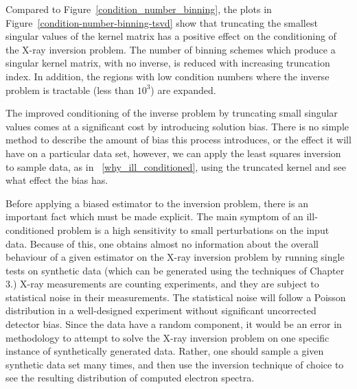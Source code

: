 Compared to Figure~\ref{condition_number_binning}, the plots in Figure~\ref{condition-number-binning-tsvd} show that truncating the smallest singular values of the kernel matrix has a positive effect on the conditioning of the X-ray inversion problem. The number of binning schemes which produce a singular kernel matrix, with no inverse, is reduced with increasing truncation index. In addition, the regions with low condition numbers where the inverse problem is tractable (less than $10^3$) are expanded. 

The improved conditioning of the inverse problem by truncating small singular values comes at a significant cost by introducing solution bias. There is no simple method to describe the amount of bias this process introduces, or the effect it will have on a particular data set, however, we can apply the least squares inversion to sample data, as in ~\ref{why_ill_conditioned}, using the truncated kernel and see what effect the bias has. 

Before applying a biased estimator to the inversion problem, there is an important fact which must be made explicit. The main symptom of an ill-conditioned problem is a high sensitivity to small perturbations on the input data. Because of this, one obtains almost no information about the overall behaviour of a given estimator on the X-ray inversion problem by running single tests on synthetic data (which can be generated using the techniques of Chapter 3.) X-ray measurements are counting experiments, and they are subject to statistical noise in their measurements. The statistical noise will follow a Poisson distribution in a well-designed experiment without significant uncorrected detector bias. Since the data have a random component, it would be an error in methodology to attempt to solve the X-ray inversion problem on one specific instance of synthetically generated data. Rather, one should sample a given synthetic data set many times, and then use the inversion technique of choice to see the resulting distribution of computed electron spectra. 

